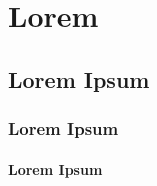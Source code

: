 \documentclass[../main.tex]{subfiles}
\begin{document}
\chapter{Lorem}\label{chap:lorem}


\lipsum[1-1]

\section{Lorem Ipsum}

\lipsum[2-2]

\subsection{Lorem Ipsum}

\lipsum[3-3]

\subsubsection{Lorem Ipsum}

\lipsum[4-4]


\end{document}
